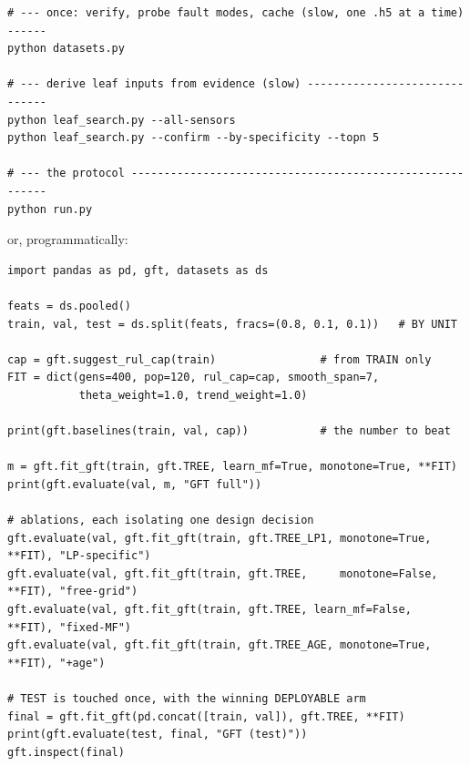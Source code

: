 \documentclass[11pt,a4paper]{article}
\begin{document}
\begin{lstlisting}
# --- once: verify, probe fault modes, cache (slow, one .h5 at a time) ------
python datasets.py

# --- derive leaf inputs from evidence (slow) ------------------------------
python leaf_search.py --all-sensors
python leaf_search.py --confirm --by-specificity --topn 5

# --- the protocol ---------------------------------------------------------
python run.py
\end{lstlisting}

\noindent or, programmatically:

\begin{lstlisting}
import pandas as pd, gft, datasets as ds

feats = ds.pooled()
train, val, test = ds.split(feats, fracs=(0.8, 0.1, 0.1))   # BY UNIT

cap = gft.suggest_rul_cap(train)                # from TRAIN only
FIT = dict(gens=400, pop=120, rul_cap=cap, smooth_span=7,
           theta_weight=1.0, trend_weight=1.0)

print(gft.baselines(train, val, cap))           # the number to beat

m = gft.fit_gft(train, gft.TREE, learn_mf=True, monotone=True, **FIT)
print(gft.evaluate(val, m, "GFT full"))

# ablations, each isolating one design decision
gft.evaluate(val, gft.fit_gft(train, gft.TREE_LP1, monotone=True,  **FIT), "LP-specific")
gft.evaluate(val, gft.fit_gft(train, gft.TREE,     monotone=False, **FIT), "free-grid")
gft.evaluate(val, gft.fit_gft(train, gft.TREE, learn_mf=False,     **FIT), "fixed-MF")
gft.evaluate(val, gft.fit_gft(train, gft.TREE_AGE, monotone=True,  **FIT), "+age")

# TEST is touched once, with the winning DEPLOYABLE arm
final = gft.fit_gft(pd.concat([train, val]), gft.TREE, **FIT)
print(gft.evaluate(test, final, "GFT (test)"))
gft.inspect(final)
\end{lstlisting}
\end{document}
